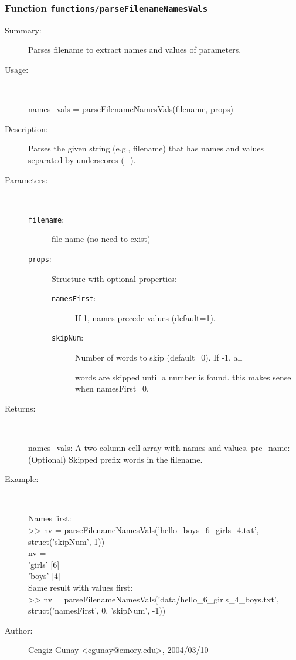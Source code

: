 \subsubsection[Function \texttt{parseFilenameNamesVals}]{Function \texttt{functions/parseFilenameNamesVals}}%
%
\label{ref_functions__parseFilenameNamesVals}%
\hypertarget{ref_functions__parseFilenameNamesVals}{}%
\begin{description}
\item[Summary:]Parses filename to extract names and values of parameters.
%
\item[Usage:]~%
\begin{lyxcode}%
names\_vals = parseFilenameNamesVals(filename, props)
%
\end{lyxcode}%
%
\item[Description:]%
Parses the given string (e.g., filename) that has names and
 values separated by underscores (\_). 
\item[Parameters:]~
\begin{description}%
\item[\texttt{filename}:]
 file name (no need to exist)
\item[\texttt{props}:]
 Structure with optional properties:
\begin{description}%
\item[\texttt{namesFirst}:]
 If 1, names precede values (default=1).
\item[\texttt{skipNum}:]
 Number of words to skip (default=0). If -1, all

words are skipped until a number is found. this
makes sense when namesFirst=0.
\end{description}%
\end{description}%
%
\item[Returns:
]~

   names\_vals: A two-column cell array with names and values.
   pre\_name: (Optional) Skipped prefix words in the filename.
%
\item[Example:]~
\begin{lyxcode} Names first:
\\%
 >> nv = parseFilenameNamesVals('hello\_boys\_6\_girls\_4.txt', struct('skipNum', 1))
\\%
 nv = 
\\%
    'girls'    [6]
\\%
    'boys'     [4]
\\%
 Same result with values first:
\\%
 >> nv = parseFilenameNamesVals('data/hello\_6\_girls\_4\_boys.txt',
\\%
                struct('namesFirst', 0, 'skipNum', -1))
\\%
\end{lyxcode}
%
%
\item[Author:]%
Cengiz Gunay <cgunay@emory.edu>, 2004/03/10
%
\end{description}
\methodline%
